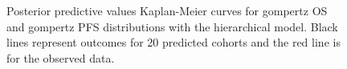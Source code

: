 \documentclass[AMA,STIX1COL]{WileyNJD-v2}
\begin{document}
\begin{figure}[H]
    \centering
    \qquad
    \caption{Posterior predictive values Kaplan-Meier curves for gompertz OS and gompertz PFS distributions with the hierarchical model. Black lines represent outcomes for 20 predicted cohorts and the red line is for the observed data.}%
\end{figure}

\newpage






\end{document}
